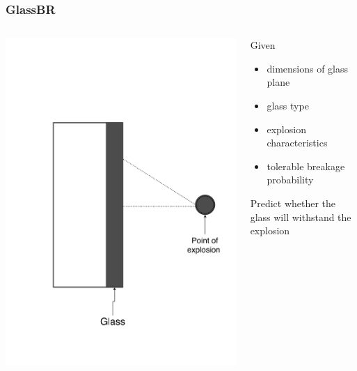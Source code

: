 \documentclass{beamer}
\begin{document}

\begin{frame}

\frametitle{GlassBR}

\begin{columns}
\begin{column}{0.5\textwidth}
\includegraphics[width=1.0\textwidth]{../figures/physicalsystimage.png}
\end{column}
\begin{column}{0.5\textwidth}
Given

\begin{itemize}
\item dimensions of glass plane
\item glass type
\item explosion characteristics
\item tolerable breakage probability
\end{itemize}

Predict whether the glass will withstand the explosion

\end{column}
\end{columns}

\end{frame}
\end{document}
